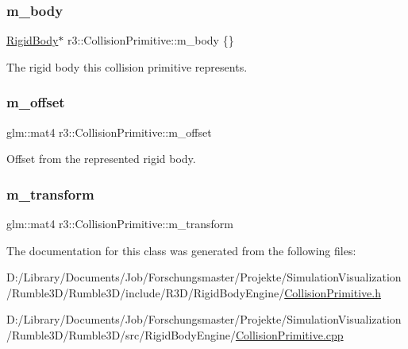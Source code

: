 \subsubsection{\texorpdfstring{m\+\_\+body}{m\_body}}
{\footnotesize\ttfamily \mbox{\hyperlink{classr3_1_1_rigid_body}{Rigid\+Body}}$\ast$ r3\+::\+Collision\+Primitive\+::m\+\_\+body \{\}\hspace{0.3cm}{\ttfamily [protected]}}



The rigid body this collision primitive represents. 

\mbox{\label{classr3_1_1_collision_primitive_a15a51c2e72a8c5122a1031d6620a2901}} 
\subsubsection{\texorpdfstring{m\+\_\+offset}{m\_offset}}
{\footnotesize\ttfamily glm\+::mat4 r3\+::\+Collision\+Primitive\+::m\+\_\+offset\hspace{0.3cm}{\ttfamily [protected]}}



Offset from the represented rigid body. 

\mbox{\label{classr3_1_1_collision_primitive_a0cb28517e7791b9836a5cac5d8550b13}} 
\subsubsection{\texorpdfstring{m\+\_\+transform}{m\_transform}}
{\footnotesize\ttfamily glm\+::mat4 r3\+::\+Collision\+Primitive\+::m\+\_\+transform\hspace{0.3cm}{\ttfamily [protected]}}



The documentation for this class was generated from the following files\+:\begin{DoxyCompactItemize}
\item 
D\+:/\+Library/\+Documents/\+Job/\+Forschungsmaster/\+Projekte/\+Simulation\+Visualization/\+Rumble3\+D/\+Rumble3\+D/include/\+R3\+D/\+Rigid\+Body\+Engine/\mbox{\hyperlink{_collision_primitive_8h}{Collision\+Primitive.\+h}}\item 
D\+:/\+Library/\+Documents/\+Job/\+Forschungsmaster/\+Projekte/\+Simulation\+Visualization/\+Rumble3\+D/\+Rumble3\+D/src/\+Rigid\+Body\+Engine/\mbox{\hyperlink{_collision_primitive_8cpp}{Collision\+Primitive.\+cpp}}\end{DoxyCompactItemize}
